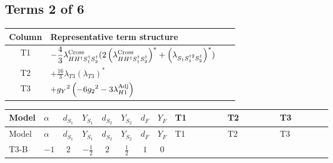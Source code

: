 \documentclass[8pt]{article}
\begin{document}
\begin{landscape}
\subsection*{Terms 2 of 6}
\begin{center}
\begin{tabular}{@{}c >{\raggedright\arraybackslash}p{0.82\linewidth}@{}}
\toprule
Column & Representative term structure \\
\midrule
T1 & \(\displaystyle -\frac{4}{3} {\lambda_{H H^\dagger S_1^\dagger S_2^\dagger}^{\rm Cross}} (2 \left({\lambda_{H H^\dagger S_1^\dagger S_2^\dagger}^{\rm Cross}}\right)^{*}+\left({\lambda_{S_1 S_1^{\dagger 2}S_2^\dagger}}\right)^{*})\) \\
\midrule
T2 & \(\displaystyle +\frac{16}{3} {\lambda_{T3}} \left({\lambda_{T3}}\right)^{*}\) \\
\midrule
T3 & \(\displaystyle +{g_Y}^2 \left(-6 {g_2}^2-3 {\lambda_{H1}^{\rm Adj}}\right)\) \\
\midrule
\bottomrule
\end{tabular}
\end{center}
\smallskip
\tiny
\begin{longtable}{@{}llcccccc >{\raggedright\arraybackslash}p{0.21\linewidth} >{\raggedright\arraybackslash}p{0.21\linewidth} >{\raggedright\arraybackslash}p{0.21\linewidth}@{}}
\toprule
Model & $\alpha$ & $d_{S_1}$ & $Y_{S_1}$ & $d_{S_2}$ & $Y_{S_2}$ & $d_F$ & $Y_F$ & T1 & T2 & T3 \\
\midrule
\endfirsthead
\toprule
Model & $\alpha$ & $d_{S_1}$ & $Y_{S_1}$ & $d_{S_2}$ & $Y_{S_2}$ & $d_F$ & $Y_F$ & T1 & T2 & T3 \\
\midrule
\endhead
T3-B & $-1$ & $2$ & $-\frac{1}{2}$ & $2$ & $\frac{1}{2}$ & $1$ & $0$ & \scriptsize\adjustbox{max width=\linewidth}{$\begin{gathered} -\frac{4}{3} {\lambda_{H H^\dagger S_1^\dagger S_2^\dagger}^{\rm Cross}} (2 \left({\lambda_{H H^\dagger S_1^\dagger S_2^\dagger}^{\rm Cross}}\right)^{*}+\left({\lambda_{S_1 S_1^{\dagger 2}S_2^\dagger}}\right)^{*})\end{gathered}$} & \scriptsize\adjustbox{max width=\linewidth}{$\begin{gathered} +\frac{16}{3} {\lambda_{T3}} \left({\lambda_{T3}}\right)^{*}\end{gathered}$} & \scriptsize\adjustbox{max width=\linewidth}{$\begin{gathered} +{g_Y}^2 \left(-6 {g_2}^2-3 {\lambda_{H1}^{\rm Adj}}\right)\end{gathered}$} \\

\end{longtable}
\end{landscape}
\end{document}
